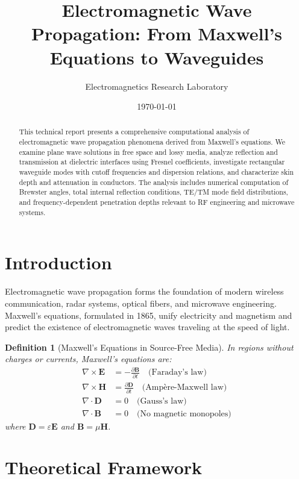 \documentclass[a4paper, 11pt]{article}
\title{Electromagnetic Wave Propagation: From Maxwell's Equations to Waveguides}
\author{Electromagnetics Research Laboratory}
\date{\today}
\newtheorem{definition}{Definition}[section]
\begin{document}
\maketitle

\begin{abstract}
This technical report presents a comprehensive computational analysis of electromagnetic
wave propagation phenomena derived from Maxwell's equations. We examine plane wave
solutions in free space and lossy media, analyze reflection and transmission at dielectric
interfaces using Fresnel coefficients, investigate rectangular waveguide modes with cutoff
frequencies and dispersion relations, and characterize skin depth and attenuation in
conductors. The analysis includes numerical computation of Brewster angles, total internal
reflection conditions, TE/TM mode field distributions, and frequency-dependent penetration
depths relevant to RF engineering and microwave systems.
\end{abstract}

\section{Introduction}

Electromagnetic wave propagation forms the foundation of modern wireless communication,
radar systems, optical fibers, and microwave engineering. Maxwell's equations, formulated
in 1865, unify electricity and magnetism and predict the existence of electromagnetic waves
traveling at the speed of light.

\begin{definition}[Maxwell's Equations in Source-Free Media]
In regions without charges or currents, Maxwell's equations are:
\begin{align}
\nabla \times \mathbf{E} &= -\frac{\partial \mathbf{B}}{\partial t} \quad \text{(Faraday's law)}\\
\nabla \times \mathbf{H} &= \frac{\partial \mathbf{D}}{\partial t} \quad \text{(Ampère-Maxwell law)}\\
\nabla \cdot \mathbf{D} &= 0 \quad \text{(Gauss's law)}\\
\nabla \cdot \mathbf{B} &= 0 \quad \text{(No magnetic monopoles)}
\end{align}
where $\mathbf{D} = \varepsilon \mathbf{E}$ and $\mathbf{B} = \mu \mathbf{H}$.
\end{definition}

\section{Theoretical Framework}
\end{document}
